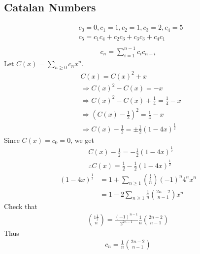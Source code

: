\documentclass{article}
\theoremstyle{definition}
\begin{document}
\subsection{Catalan Numbers}
\begin{align*}
    &c_0 = 0, c_1 = 1, c_2 = 1, c_3 = 2, c_4 = 5 \\ 
    &c_5 = c_1 c_4 + c_2 c_3 + c_3 c_3 + c_4c_1 \\ 
\end{align*}
\begin{align*}
    c_n = \sum_{i=1}^{n-1} c_i c_{n-i}
\end{align*}
Let $C(x) = \sum_{n\ge 0} c_n x^n$. 
\begin{align*}
    &C(x) = C(x)^2 + x \\ 
    & \Rightarrow C(x)^2 - C(x) = -x \\ 
    & \Rightarrow C(x)^2 - C(x) + \frac{1}{4} = \frac{1}{4} - x\\
    & \Rightarrow \left(C(x) - \frac{1}{2}\right)^2 = \frac{1}{4} - x\\
    & \Rightarrow C(x) - \frac{1}{2} = \pm \frac{1}{2} (1-4x)^{\frac{1}{2}}
\end{align*}
Since $C(x) = c_0 = 0$, we get 
\begin{align*}
    &C(x) - \frac{1}{2} = -\frac{1}{2}(1-4x)^{\frac{1}{2}} \\ 
    &\therefore C(x) = \frac{1}{2} -  \frac{1}{2}(1-4x)^{\frac{1}{2}}
\end{align*}
\begin{align*}
    (1-4x)^{\frac{1}{2}} &= 1 + \sum_{n\ge 1} {\frac{1}{2} \choose n} (-1)^n 4^n x^n \\ 
    &= 1- 2\sum_{n\ge 1}\frac{1}{n}{2n-2 \choose n-1 } x^n
\end{align*}
Check that 
\begin{align*}
    {1\frac{1}{2} \choose n} = \frac{(-1)^{n-1}}{2^{2n-1}}\frac{1}{n}{2n -2 \choose n-1}
\end{align*}
Thus
\begin{align*}
    c_n = \frac{1}{n} {2n-2\choose n-1}
\end{align*}
\end{document}

